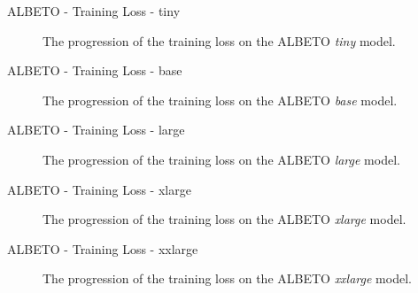 \documentclass[aspectratio=169,xcolor=dvipsnames]{beamer}
\begin{document}
\begin{frame}{ALBETO - Training Loss - tiny}

\begin{figure}
    \centering
    \def\svgwidth{\columnwidth}
    
    \caption{The progression of the training loss on the ALBETO \textit{tiny} model.}
    \label{fig:loss-albeto-tiny}
\end{figure}

\end{frame}
\begin{frame}{ALBETO - Training Loss - base}

\begin{figure}
    \centering
    \def\svgwidth{\columnwidth}
    
    \caption{The progression of the training loss on the ALBETO \textit{base} model.}
    \label{fig:loss-albeto-base}
\end{figure}

\end{frame}
\begin{frame}{ALBETO - Training Loss - large}

\begin{figure}
    \centering
    \def\svgwidth{\columnwidth}
    
    \caption{The progression of the training loss on the ALBETO \textit{large} model.}
    \label{fig:loss-albeto-large}
\end{figure}

\end{frame}
\begin{frame}{ALBETO - Training Loss - xlarge}

\begin{figure}
    \centering
    \def\svgwidth{\columnwidth}
    
    \caption{The progression of the training loss on the ALBETO \textit{xlarge} model.}
    \label{fig:loss-albeto-xlarge}
\end{figure}

\end{frame}
\begin{frame}{ALBETO - Training Loss - xxlarge}

\begin{figure}
    \centering
    \def\svgwidth{\columnwidth}
    
    \caption{The progression of the training loss on the ALBETO \textit{xxlarge} model.}
    \label{fig:loss-albeto-xxlarge}
\end{figure}

\end{frame}
\end{document}
